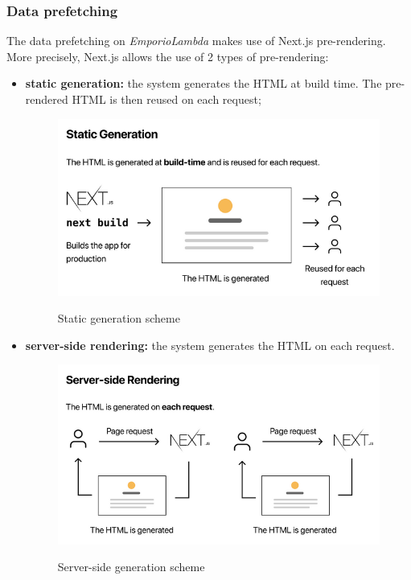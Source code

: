 \subsubsection{Data prefetching}
The data prefetching on \textit{EmporioLambda} makes use of Next.js pre-rendering.\\
More precisely, Next.js allows the use of 2 types of pre-rendering:
\begin{itemize}
\item \textbf{static generation:} the system generates the HTML at build time. The pre-rendered HTML is then reused on each request;
\begin{figure}[H]
\centering
\includegraphics[scale=0.70]{res/Architettura/Frontend/img/staticGeneration}\\
\caption{Static generation scheme}
\end{figure}
\vspace{0.7cm}
\item \textbf{server-side rendering:} the system generates the HTML on each request.
\begin{figure}[H]
\centering
\includegraphics[scale=0.70]{res/Architettura/Frontend/img/serverSideRendering}\\
\caption{Server-side generation scheme}
\end{figure}
\vspace{0.7cm}
\end{itemize}
